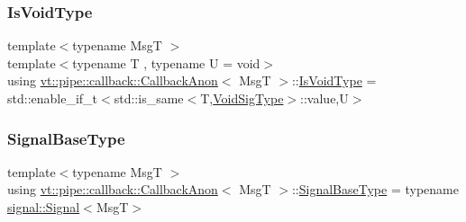 \mbox{\label{structvt_1_1pipe_1_1callback_1_1_callback_anon_a3aa19d4a1044d57ba4af22015331c20a}} 
\subsubsection{\texorpdfstring{Is\+Void\+Type}{IsVoidType}}
{\footnotesize\ttfamily template$<$typename MsgT $>$ \\
template$<$typename T , typename U  = void$>$ \\
using \hyperlink{structvt_1_1pipe_1_1callback_1_1_callback_anon}{vt\+::pipe\+::callback\+::\+Callback\+Anon}$<$ MsgT $>$\+::\hyperlink{structvt_1_1pipe_1_1callback_1_1_callback_anon_a3aa19d4a1044d57ba4af22015331c20a}{Is\+Void\+Type} =  std\+::enable\+\_\+if\+\_\+t$<$std\+::is\+\_\+same$<$T,\hyperlink{structvt_1_1pipe_1_1callback_1_1_callback_anon_a37f2e8be7b6c014a2a33232b678a05cc}{Void\+Sig\+Type}$>$\+::value,U$>$}

\mbox{\label{structvt_1_1pipe_1_1callback_1_1_callback_anon_a84629a45a0c53a8804a4fa68b6b4aaa7}} 
\subsubsection{\texorpdfstring{Signal\+Base\+Type}{SignalBaseType}}
{\footnotesize\ttfamily template$<$typename MsgT $>$ \\
using \hyperlink{structvt_1_1pipe_1_1callback_1_1_callback_anon}{vt\+::pipe\+::callback\+::\+Callback\+Anon}$<$ MsgT $>$\+::\hyperlink{structvt_1_1pipe_1_1callback_1_1_callback_anon_a84629a45a0c53a8804a4fa68b6b4aaa7}{Signal\+Base\+Type} =  typename \hyperlink{structvt_1_1pipe_1_1signal_1_1_signal}{signal\+::\+Signal}$<$MsgT$>$}

\mbox{\label{structvt_1_1pipe_1_1callback_1_1_callback_anon_ac503b95feb44bb0b60c1d69e1ed29074}} 
